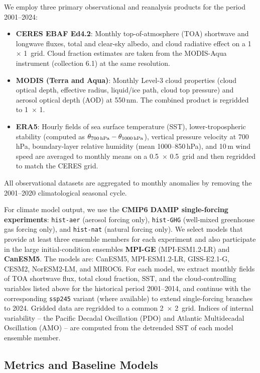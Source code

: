 \documentclass{article}
\begin{document}
We employ three primary observational and reanalysis products for the period 2001--2024:
\begin{itemize}
    \item \textbf{CERES EBAF Ed4.2}: Monthly top-of-atmosphere (TOA) shortwave and longwave fluxes, total and clear-sky albedo, and cloud radiative effect on a 1\degree\ $\times$ 1\degree\ grid. Cloud fraction estimates are taken from the MODIS-Aqua instrument (collection 6.1) at the same resolution.
    \item \textbf{MODIS (Terra and Aqua)}: Monthly Level-3 cloud properties (cloud optical depth, effective radius, liquid/ice path, cloud top pressure) and aerosol optical depth (AOD) at 550\,nm. The combined product is regridded to 1\degree\ $\times$ 1\degree.
    \item \textbf{ERA5}: Hourly fields of sea surface temperature (SST), lower-tropospheric stability (computed as $\theta_{700\thinspace\mathrm{hPa}} - \theta_{1000\thinspace\mathrm{hPa}}$), vertical pressure velocity at 700\,hPa, boundary-layer relative humidity (mean 1000--850\,hPa), and 10\,m wind speed are averaged to monthly means on a 0.5\degree\ $\times$ 0.5\degree\ grid and then regridded to match the CERES grid.
\end{itemize}
All observational datasets are aggregated to monthly anomalies by removing the 2001--2020 climatological seasonal cycle.

For climate model output, we use the \textbf{CMIP6 DAMIP single-forcing experiments}: \texttt{hist-aer} (aerosol forcing only), \texttt{hist-GHG} (well-mixed greenhouse gas forcing only), and \texttt{hist-nat} (natural forcing only). We select models that provide at least three ensemble members for each experiment and also participate in the large initial-condition ensembles \textbf{MPI-GE} (MPI-ESM1.2-LR) and \textbf{CanESM5}. The models are: CanESM5, MPI-ESM1.2-LR, GISS-E2.1-G, CESM2, NorESM2-LM, and MIROC6. For each model, we extract monthly fields of TOA shortwave flux, total cloud fraction, SST, and the cloud-controlling variables listed above for the historical period 2001--2014, and continue with the corresponding \texttt{ssp245} variant (where available) to extend single-forcing branches to 2024. Gridded data are regridded to a common 2\degree\ $\times$ 2\degree\ grid. Indices of internal variability -- the Pacific Decadal Oscillation (PDO) and Atlantic Multidecadal Oscillation (AMO) -- are computed from the detrended SST of each model ensemble member.

\subsection{Metrics and Baseline Models}
\end{document}
